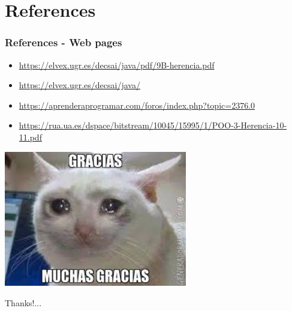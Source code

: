\documentclass[11pt]{beamer}
\begin{document}
\section{References}
\begin{frame}
\frametitle{References - Web pages}
\begin{itemize}
\item \url{https://elvex.ugr.es/decsai/java/pdf/9B-herencia.pdf}
\item \url{https://elvex.ugr.es/decsai/java/}
\item \url{https://aprenderaprogramar.com/foros/index.php?topic=2376.0}
\item \url{https://rua.ua.es/dspace/bitstream/10045/15995/1/POO-3-Herencia-10-11.pdf}

\end{itemize}
\end{frame}



\begin{frame}
\begin{center}
{\includegraphics[width=8.0cm]{img/meme.jpeg}}
\end{center}
\begin{center}
Thanks!...
\
\end{center}
\end{frame}
\end{document}
